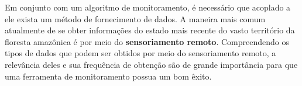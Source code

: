 Em conjunto com um algoritmo de monitoramento, é necessário que acoplado a ele exista um método de fornecimento de dados. A maneira mais comum atualmente de se obter informações do estado mais recente do vasto território da floresta amazônica é por meio do \textbf{sensoriamento remoto}. Compreendendo os tipos de dados que podem ser obtidos por meio do sensoriamento remoto, a relevância deles e sua frequência de obtenção são de grande importância para que uma ferramenta de monitoramento possua um bom êxito.





   
